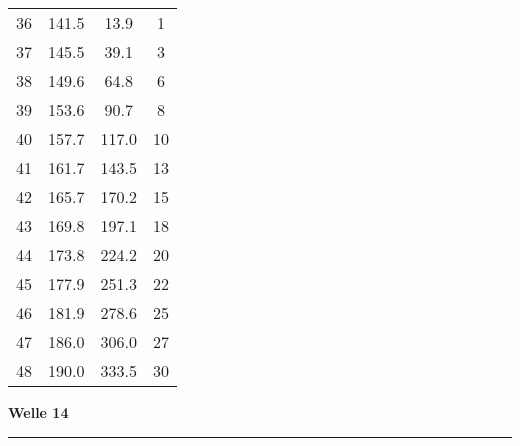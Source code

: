 \documentclass[10pt, a4paper]{article}
\begin{document}
\begin{center}
\begin{tabular}{c|c|c|c}
		36 & 141.5 & 13.9 & 1 \\
		37 & 145.5 & 39.1 & 3 \\
		38 & 149.6 & 64.8 & 6 \\
		39 & 153.6 & 90.7 & 8 \\
		40 & 157.7 & 117.0 & 10 \\
		41 & 161.7 & 143.5 & 13 \\
		42 & 165.7 & 170.2 & 15 \\
		43 & 169.8 & 197.1 & 18 \\
		44 & 173.8 & 224.2 & 20 \\
		45 & 177.9 & 251.3 & 22 \\
		46 & 181.9 & 278.6 & 25 \\
		47 & 186.0 & 306.0 & 27 \\
		48 & 190.0 & 333.5 & 30 \\
	\end{tabular}
\end{center}
\newpage
\centerline{{\bf Welle 14} }
\rule{1.0\textwidth}{0.5mm}
\end{document}
